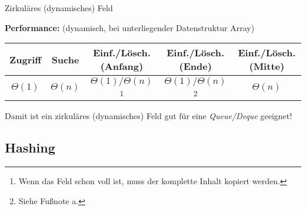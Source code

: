 \begin{defi}{Zirkuläres (dynamisches) Feld}
\begin{center}
    \end{center}

    \textbf{Performance:} (dynamisch, bei unterliegender Datenstruktur Array)

    \begin{center}
        \begin{tabular}{c|c|c|c|c}
            Zugriff     & Suche       & Einf./Lösch. (Anfang)                                                                                   & Einf./Lösch. (Ende)                              & Einf./Lösch. (Mitte) \\
            \hline
            $\Theta(1)$ & $\Theta(n)$ & $\Theta(1)/\Theta(n)$\footnote{Wenn das Feld schon voll ist, muss der komplette Inhalt kopiert werden.} & $\Theta(1)/\Theta(n)$\footnote{Siehe Fußnote a.} & $\Theta(n)$          \\
        \end{tabular}
    \end{center}

    Damit ist ein zirkuläres (dynamisches) Feld gut für eine \emph{Queue/Deque} geeignet!
\end{defi}


\subsection{Hashing}


